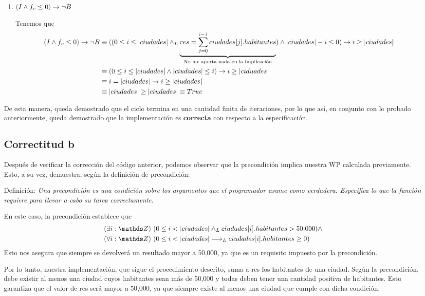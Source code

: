 \documentclass[10pt,a4paper]{article}
\begin{document}
\begin{enumerate}
	\item $(I \land f_v \leq 0) \rightarrow \neg B$

	      Tenemos que
	      \begin{align*}
		      (I \land f_v \leq 0) \rightarrow \neg B & \equiv ((0 \leq i \leq |ciudades| \land _L \underbrace{res = \sum_{j = 0}^{i - 1} ciudades[j].habitantes}_{\text{No me aporta nada en la implicación}}) \land |ciudades| - i \leq 0) \rightarrow i \geq |ciudades| \\
		                                        & \equiv (0 \leq i \leq |ciudades| \land |ciudades| \leq i) \rightarrow i \geq |ciduades|                                                                                                                           \\
		                                        & \equiv i = |ciudades| \rightarrow i \geq |ciudades|                                                                                                                                                               \\
		                                        & \equiv |ciudades| \geq |ciudades| \equiv True
	      \end{align*}
\end{enumerate}

De esta manera, queda demostrado que el ciclo termina en una cantidad finita de iteraciones, por lo que así, en conjunto con lo probado anteriormente, queda demostrado que la implementación es \textbf{correcta} con respecto a la especificación.

\subsection{Correctitud b}
Después de verificar la corrección del código anterior, podemos observar que la precondición implica nuestra WP calculada previamente. Esto, a su vez, demuestra, según la definición de precondición:
\medskip

Definición: \textit{Una precondición es una condición sobre los argumentos que el programador asume como verdadera. Especifica lo que la función requiere para llevar a cabo su tarea correctamente.}
\medskip

En este caso, la precondición establece que
\begin{align*}
	 & \existe[unalinea]{i}{\ent}{0 \leq i < |ciudades| \yLuego ciudades[i].habitantes > 50.000} \land \\
	 & \paraTodo[unalinea]{i}{\ent}{0 \leq i < |ciudades| \implicaLuego ciudades[i].habitantes \geq 0}
\end{align*}
Esto nos asegura que siempre se devolverá un resultado mayor a 50,000, ya que es un requisito impuesto por la precondición.
\medskip

Por lo tanto, nuestra implementación, que sigue el procedimiento descrito, suma a res los habitantes de una ciudad. Según la precondición, debe existir al menos una ciudad cuyos habitantes sean más de 50,000 y todas deben tener una cantidad positiva de habitantes. Esto garantiza que el valor de res será mayor a 50,000, ya que siempre existe al menos una ciudad que cumple con dicha condición.
\end{document}
